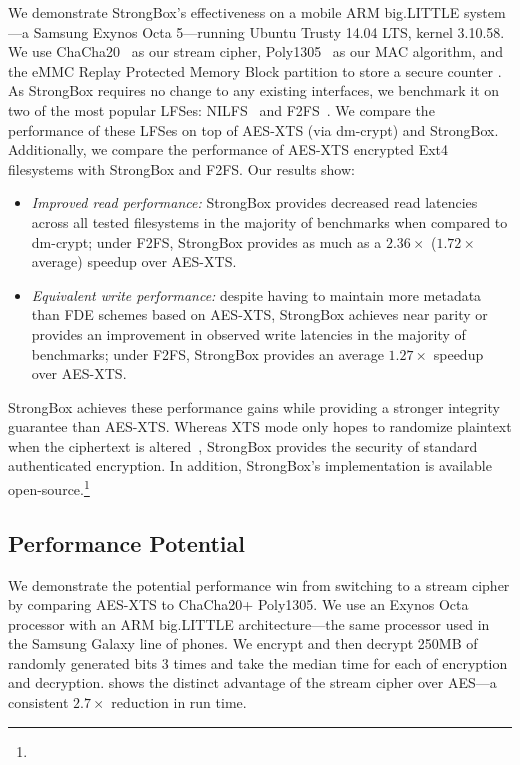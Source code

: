 We demonstrate StrongBox's effectiveness on a mobile ARM big.LITTLE system---a
Samsung Exynos Octa 5---running Ubuntu Trusty 14.04 LTS, kernel 3.10.58. We use
ChaCha20~\cite{ChaCha20} as our stream cipher, Poly1305~\cite{Poly1305} as our
MAC algorithm, and the eMMC Replay Protected Memory Block partition to store a
secure counter \cite{eMMC-standard}. As StrongBox requires no change to any
existing interfaces, we benchmark it on two of the most popular LFSes:
NILFS~\cite{NILFS} and F2FS~\cite{F2FS}. We compare the performance of these
LFSes on top of AES-XTS (via dm-crypt) and StrongBox. Additionally, we compare
the performance of AES-XTS encrypted Ext4 filesystems with StrongBox and F2FS.
Our results show:

\begin{itemize}

  \item \emph{Improved read performance:} StrongBox provides decreased read
latencies across all tested filesystems in the majority of benchmarks when
compared to dm-crypt; \eg under F2FS, StrongBox provides as much as a
$2.36\times$ ($1.72\times$ average) speedup over AES-XTS\@.

  \item \emph{Equivalent write performance:} despite having to maintain more
metadata than FDE schemes based on AES-XTS, StrongBox achieves near parity or
provides an improvement in observed write latencies in the majority of
benchmarks; \eg under F2FS, StrongBox provides an average $1.27\times$ speedup
over AES-XTS\@.

\end{itemize}

StrongBox achieves these performance gains while providing a stronger integrity
guarantee than AES-XTS\@. Whereas XTS mode only hopes to randomize plaintext when
the ciphertext is altered~\cite{XTS}, StrongBox provides the security of
standard authenticated encryption. In addition, StrongBox's implementation is
available open-source.\footnote{\StrongBoxURI}

\subsection{Performance Potential}

We demonstrate the potential performance win from switching to a stream cipher
by comparing AES-XTS to ChaCha20+ Poly1305. We use an Exynos Octa processor with
an ARM big.LITTLE architecture---the same processor used in the Samsung Galaxy
line of phones. We encrypt and then decrypt 250MB of randomly generated bits 3
times and take the median time for each of encryption and decryption.
 shows the distinct advantage of the stream cipher over
AES---a consistent $2.7\times$ reduction in run time.

